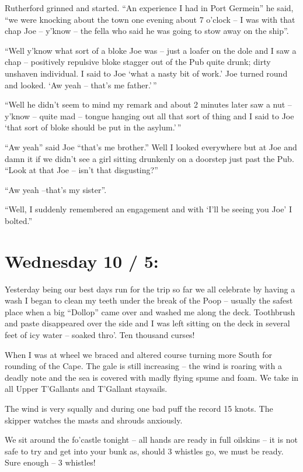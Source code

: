 \documentclass[
  11pt,
  msmallroyalvopaper
]{memoir}
\begin{document}
Rutherford grinned and started. ``An experience I had in Port Germein''
he said, ``we were knocking about the town one evening about 7 o'clock
-- I was with that chap Joe -- y'know -- the fella who said he was going
to stow away on the ship''.

``Well y'know what sort of a bloke Joe was -- just a loafer on the dole
and I saw a chap -- positively repulsive bloke stagger out of the Pub
quite drunk; dirty unshaven individual. I said to Joe `what a nasty bit
of work.' Joe turned round and looked. `Aw yeah -- that's me
father.'\,''

``Well he didn't seem to mind my remark and about 2 minutes later saw a
nut -- y'know -- quite mad -- tongue hanging out all that sort of thing
and I said to Joe `that sort of bloke should be put in the asylum.'\,''

``Aw yeah'' said Joe ``that's me brother.'' Well I looked everywhere but
at Joe and damn it if we didn't see a girl sitting drunkenly on a
doorstep just past the Pub. ``Look at that Joe -- isn't that
disgusting?''

``Aw yeah --that's my sister''.

``Well, I suddenly remembered an engagement and with `I'll be seeing you
Joe' I bolted.''

\hypertarget{wednesday-10-5}{%
\section{Wednesday 10 / 5:}\label{wednesday-10-5}}

Yesterday being our best days run for the trip so far we all celebrate
by having a wash I began to clean my teeth under the break of the Poop
-- usually the safest place when a big ``Dollop'' came over and washed
me along the deck. Toothbrush and paste disappeared over the side and I
was left sitting on the deck in several feet of icy water -- soaked
thro'. Ten thousand curses!

When I was at wheel we braced and altered course turning more South for
rounding of the Cape. The gale is still increasing -- the wind is
roaring with a deadly note and the sea is covered with madly flying
spume and foam. We take in all Upper T'Gallants and T'Gallant staysails.

The wind is very squally and during one bad puff the record 15 knots.
The skipper watches the masts and shrouds anxiously.

We sit around the fo'castle tonight -- all hands are ready in full
oilskins -- it is not safe to try and get into your bunk as, should 3
whistles go, we must be ready. Sure enough -- 3 whistles!
\end{document}

